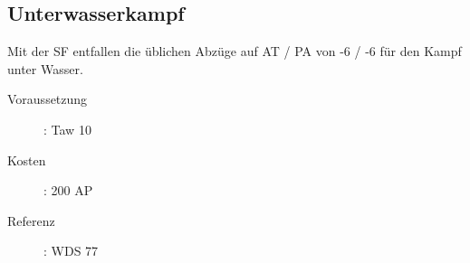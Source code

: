 \subsection{Unterwasserkampf}
\label{sf.unterwasserkampf}
Mit der SF  entfallen die üblichen Abzüge auf AT / PA von -6 / -6 für den Kampf unter Wasser.
\begin{description}
    \item[Voraussetzung]:
        Taw  10
    \item [Kosten]:
        200 AP
    \item [Referenz]:
        WDS 77
\end{description}
